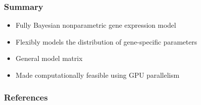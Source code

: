\documentclass{beamer}
\newcommand{\op}{\operatorname}
\newcommand{\ind}{\stackrel{ind}{\sim}}
\begin{document}
\begin{frame}
\frametitle{Summary}
  \begin{itemize}
    \item Fully Bayesian nonparametric gene expression model
    \item Flexibly models the distribution of gene-specific parameters
    \item General model matrix
    \item Made computationally feasible using GPU parallelism
  \end{itemize}
\end{frame}

\begin{frame}[allowframebreaks]
  \tiny
  \frametitle{References}
  
  
\end{frame}



% 
% 
\end{document}
